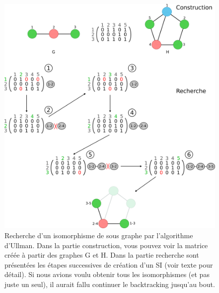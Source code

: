 \begin{figure}[!ht]
  \begin{center}
    \includegraphics[width=450px]{Figures/s2m/MCS-SI/ullman.png}
    \caption{\label{ullman_fig}Recherche d'un isomorphisme de sous graphe par l'algorithme d'Ullman.
    Dans la partie construction, vous pouvez voir la matrice créée à partir des graphes G et H.
    Dans la partie recherche sont présentées les étapes successives de création d'un SI (voir texte pour détail).
    Si nous avions voulu obtenir tous les isomorphismes (et pas juste un seul), il aurait fallu continuer le backtracking jusqu'au bout.}
  \end{center}
\end{figure}

